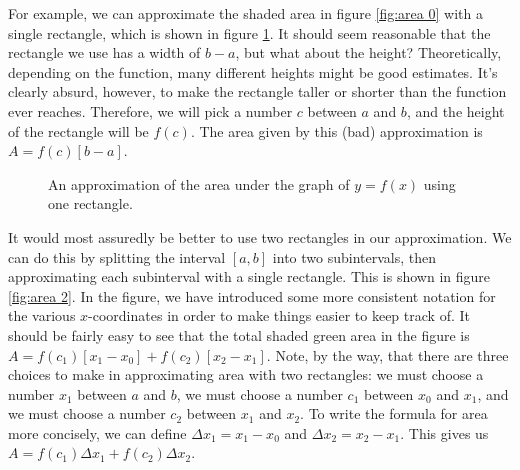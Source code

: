 \documentclass{myarticle}
\theoremstyle{nospace}
\newtheorem{old series theorem}{Theorem}
\newenvironment{series theorem}
{\begin{mdframed}\begin{old series theorem}}
    {\end{old series theorem}\end{mdframed}}
\begin{document}
For example, we can approximate the shaded area in figure
\ref{fig:area 0} with a single rectangle, which is shown in figure
\ref{fig:area 1}. It should seem reasonable that the rectangle we use
has a width of $b - a$, but what about the height? Theoretically,
depending on the function, many different heights might be good
estimates. It's clearly absurd, however, to make the rectangle taller
or shorter than the function ever reaches. Therefore, we will pick a
number $c$ between $a$ and $b$, and the height of the rectangle will
be $f(c)$. The area given by this (bad) approximation is
$A = f(c)[b - a]$.

\begin{figure}[htb!] \centering
  \caption{An approximation of the area under the graph of $y = f(x)$
    using one rectangle.}
  \label{fig:area 1}
\end{figure}

It would most assuredly be better to use two rectangles in our
approximation. We can do this by splitting the interval $[a, b]$ into
two subintervals, then approximating each subinterval with a single
rectangle. This is shown in figure \ref{fig:area 2}. In the figure, we
have introduced some more consistent notation for the various
$x$-coordinates in order to make things easier to keep track of. It
should be fairly easy to see that the total shaded green area in the
figure is $A = f(c_1)[x_1 - x_0] + f(c_2)[x_2 - x_1]$. Note, by the
way, that there are three choices to make in approximating area with
two rectangles: we must choose a number $x_1$ between $a$ and $b$, we
must choose a number $c_1$ between $x_0$ and $x_1$, and we must choose
a number $c_2$ between $x_1$ and $x_2$. To write the formula for area
more concisely, we can define $\Delta x_1 = x_1 - x_0$ and
$\Delta x_2 = x_2 - x_1$. This gives us
$A = f(c_1)\Delta x_1 + f(c_2)\Delta x_2$.
\end{document}

